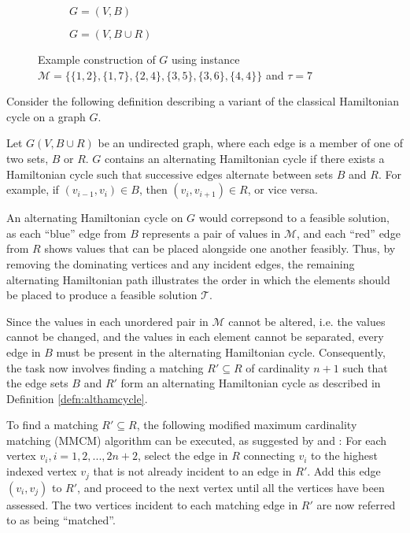 \documentclass[oribibl]{llncs}
\begin{document}
\begin{figure}	
\centering
\begin{subfigure}[h]{0.45\textwidth}
	
	\caption{$G = (V, B)$}	
	\label{fig:partners}
\end{subfigure} \hspace{40pt}
\begin{subfigure}[h]{0.45\textwidth}
	
	\caption{$G=(V, B \cup R)$}	
	\label{fig:threshold}
\end{subfigure}
\caption{Example construction of $G$ using instance $\mathcal{M}  = \{\{1,2\}, \{1,7\}, \{2,4\}, \{3,5\}, \{3,6\}, \{4,4\}\}$ and $\tau = 7$}
\label{fig:partners/threshold}
\end{figure}


Consider the following definition describing a variant of the classical Hamiltonian cycle on a graph $G$.

\begin{definition}
	\label{defn:althamcycle}
	Let $G(V, B\cup R)$ be an undirected graph, where each edge is a member of one of two sets, $B$ or $R$. $G$ contains an alternating Hamiltonian cycle if there exists a Hamiltonian cycle such that successive edges alternate between sets $B$ and $R$. For example, if $(v_{i-1}, v_i) \in B$, then $(v_i, v_{i+1}) \in R$, or vice versa.
\end{definition}


An alternating Hamiltonian cycle on $G$ would correpsond to a feasible solution, as each ``blue'' edge from $B$ represents a pair of values in $\mathcal{M}$, and each ``red'' edge from $R$ shows values that can be placed alongside one another feasibly. Thus, by removing the dominating vertices and any incident edges, the remaining alternating Hamiltonian path illustrates the order in which the elements should be placed to produce a feasible solution $\mathcal{T}$.


Since the values in each unordered pair in $\mathcal{M}$ cannot be altered, i.e. the values cannot be changed, and the values in each element cannot be separated, every edge in $B$ must be present in the alternating Hamiltonian cycle. Consequently, the task now involves finding a matching $R' \subseteq R$ of cardinality $n+1$ such that the edge sets $B$ and $R'$ form an alternating Hamiltonian cycle as described in Definition \ref{defn:althamcycle}. 



To find a matching $R' \subseteq R$, the following modified maximum cardinality matching (MMCM) algorithm can be executed, as suggested by \cite{mahadev1994} and \cite{becker2010}: For each vertex $v_i, i=1,2,...,2n+2$, select the edge in $R$ connecting $v_i$ to the highest indexed vertex $v_j$ that is not already incident to an edge in $R'$. Add this edge $(v_i, v_j)$ to $R'$, and proceed to the next vertex until all the vertices have been assessed. The two vertices incident to each matching edge in $R'$ are now referred to as being ``matched''.
\end{document}

